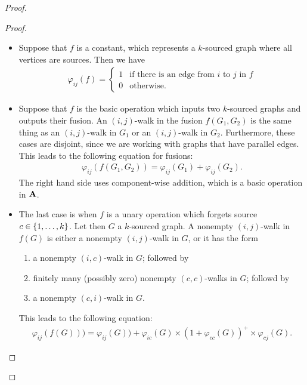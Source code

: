 \begin{proof}
\begin{proof}
            \begin{itemize}
                \item Suppose that $f$ is a constant, which represents a  $k$-sourced graph where all vertices are sources. Then we have 
                \begin{align*}
                \varphi_{ij}(f) = \begin{cases}
                    1 & \text{if there is an edge from $i$ to $j$ in $f$}\\
                    0 & \text{otherwise.}
                \end{cases}
                \end{align*}
                \item Suppose that $f$ is the  basic operation which inputs two $k$-sourced graphs and outputs their fusion.  
                An $(i,j)$-walk in the fusion $f(G_1,G_2)$ is the same thing as an $(i,j)$-walk in $G_1$ or an $(i,j)$-walk in $G_2$. Furthermore, these cases are disjoint, since we are working with graphs that have parallel edges.  This leads to the following equation for fusions:
                \begin{align*}
                \varphi_{ij}(f(G_1,G_2)) = \varphi_{ij}(G_1) + \varphi_{ij}(G_2).
                \end{align*}
                The right hand side uses component-wise addition, which is a basic operation in $\mathbf{A}$.
                \item The last case is when $f$ is a unary operation which forgets  source $c \in \{1,\ldots,k\}$.  Let then $G$ a $k$-sourced graph. A nonempty $(i,j)$-walk in $f(G)$ is either a nonempty $(i,j)$-walk in $G$, or it has the form
                \begin{enumerate}
                    \item a nonempty $(i,c)$-walk in $G$; followed by 
                    \item finitely many (possibly zero) nonempty  $(c,c)$-walks in $G$; followd by
                    \item a nonempty $(c,i)$-walk in $G$.
                \end{enumerate}
                This leads to the following equation:
                \begin{align*}
                \varphi_{ij}(f(G))) = \varphi_{ij}(G)) +  \varphi_{ic}(G) \times (1+ \varphi_{cc}(G))^+  \times \varphi_{cj}(G).
                \end{align*}                
            \end{itemize}
        \end{proof}
        
\end{proof}

